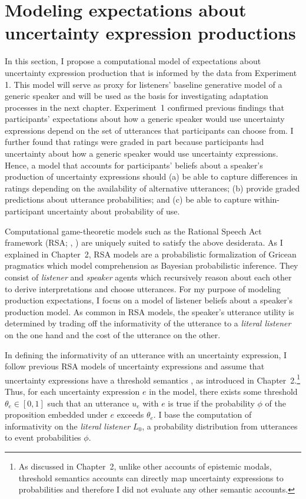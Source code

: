  





\section{Modeling expectations about uncertainty expression productions}
\label{sec:model-baseline}

In this section, I propose a computational model of expectations about uncertainty expression production that is informed by the data from Experiment 1. This model will serve as proxy for listeners' baseline generative model of a generic speaker and will be used as the basis for investigating adaptation processes in the next chapter. Experiment~1 confirmed previous findings that participants' expectations 
about how a generic speaker would use uncertainty expressions 
depend on the set of utterances that participants can choose from.
I further found that ratings were graded in part because participants had uncertainty about how a generic speaker would use uncertainty expressions. 
Hence, a model that accounts for participants' beliefs about a speaker's production of uncertainty expressions
 should  (a) be able to capture differences in ratings depending on the availability of alternative utterances;
(b) provide graded predictions about utterance probabilities; 
and (c) be able to capture within-participant uncertainty about probability of use.

Computational game-theoretic models such as the Rational Speech Act 
framework (RSA; \citeauthor{Goodman2016}, \citeyear{Goodman2016})  are uniquely suited to satisfy the above desiderata.
As I explained in Chapter~2, RSA models are a probabilistic formalization of Gricean pragmatics which model comprehension as Bayesian probabilistic inference. 
They consist of \textit{listener} and \textit{speaker} agents which recursively reason about each other to derive interpretations and choose utterances. 
For my purpose of modeling production expectations, I focus on a model of listener beliefs about a speaker's production model.
As common in RSA models, the {speaker}'s utterance utility is determined by trading off the informativity of the utterance to a \textit{literal listener} on the one hand and the cost of the utterance on the other.

In defining the informativity of an utterance with an uncertainty expression, I follow previous RSA models of uncertainty expressions \cite{Herbstritt2019}
and assume that uncertainty expressions have a threshold semantics \cite{Swanson2006,Yalcin2010,Lassiter2016}, as introduced in Chapter~2.\footnote{As discussed in Chapter~2, unlike other accounts of epistemic modals, threshold semantics accounts can directly map uncertainty expressions to probabilities and therefore I did not evaluate any other semantic accounts.} Thus, for each uncertainty expression $e$ in the model, there exists some threshold $\theta_e \in [0,1]$ 
such that an utterance $u_e$ with $e$ is true if the probability $\phi$ 
of the proposition embedded under $e$ exceeds $\theta_e$. 
I base the computation of informativity on the \textit{literal listener} $L_0$,  a probability distribution from utterances to event probabilities $\phi$.

